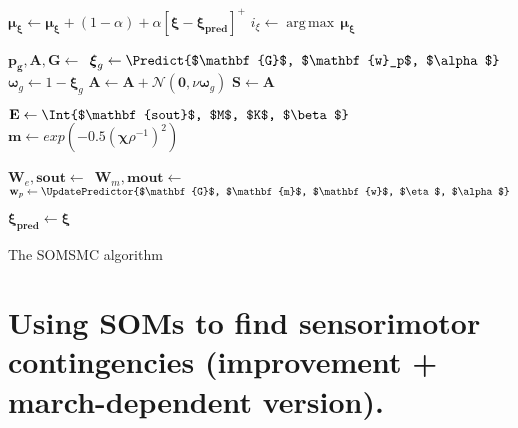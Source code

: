 \documentclass[a4paper]{article}
\DeclareMathOperator*{\argmax}{\operatorname*{arg\,max}} %
\begin{document}
\begin{algorithm}[H]
{{        
        $\boldsymbol{\mu_{\xi}}\leftarrow\boldsymbol{\mu_{\xi}} + \left(1-\alpha\right) + \alpha\left[\boldsymbol{\xi} - \boldsymbol{\xi_{pred}}\right]^{+}$\;
        $i_{\xi} \leftarrow \argmax\,\boldsymbol{\mu_{\xi}}$\;
                
        \BlankLine
         
    	$\mathbf{p_g}, \mathbf{A},\mathbf{G}\leftarrow$\,\;  
        $\boldsymbol{\xi}_{g}\leftarrow\Predict{$\mathbf{G}$, $\mathbf{w}_p$, $\alpha$}$\;
        $\boldsymbol{\omega}_{g}\leftarrow 1 - \boldsymbol{\xi}_{g}$\;
        $\mathbf{A}\leftarrow\mathbf{A} + \mathcal{N}(\mathbf{0}, \nu\boldsymbol{\omega}_{g})$\; 
        $\mathbf{S}\leftarrow\mathbf{A}$\;
        
        \BlankLine
         
        $\mathbf{E}\leftarrow\Int{$\mathbf{sout}$, $M$, $K$, $\beta$}$\;
		$\mathbf{m} \leftarrow exp(-0.5(\boldsymbol{\chi}\rho^{-1})^2)$\;
                   
        \BlankLine
        
        $\mathbf{W}_e,\mathbf{sout}\leftarrow$\,\;
        $\mathbf{W}_m,\mathbf{mout}\leftarrow$\,\;       
        $\mathbf{w}_p\leftarrow\UpdatePredictor{$\mathbf{G}$, $\mathbf{m}$, $\mathbf{w}$, $\eta$, $\alpha$}$\;
                            
        \BlankLine
        
        $\boldsymbol{\xi_{pred}} \leftarrow \boldsymbol{\xi}$
                                    
        \BlankLine
          
    }
}
\caption{The SOMSMC algorithm}\label{smc2}
\end{algorithm}
\DecMargin{1em}

\pagebreak
\section*{Using SOMs to find sensorimotor contingencies (improvement + march-dependent version).}
\end{document}

